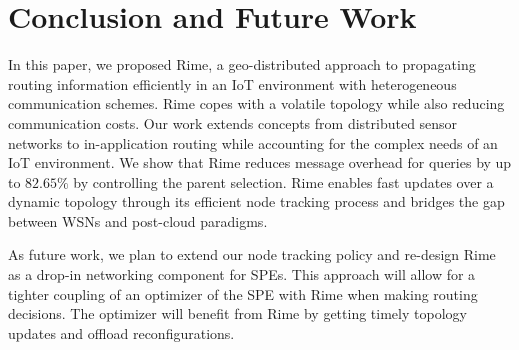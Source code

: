 \section{Conclusion and Future Work}
\label{sec:conclusion}
In this paper, we proposed Rime, a geo-distributed approach to propagating routing information efficiently in an IoT environment with heterogeneous communication schemes.
Rime copes with
a volatile topology while also reducing communication costs. Our work extends concepts from distributed sensor networks to in-application routing while accounting for the complex needs of an IoT environment. We show that Rime reduces message overhead for queries by up to $82.65\%$
by controlling the parent selection. Rime enables
fast updates over a dynamic topology through its efficient node tracking process and bridges the gap between WSNs and post-cloud paradigms.

As future work, we plan to extend our node tracking policy and re-design Rime as a drop-in networking component for SPEs. This approach will allow for a tighter coupling of an optimizer of the SPE with Rime when making routing decisions. The optimizer will benefit from Rime by getting timely topology updates and offload reconfigurations.